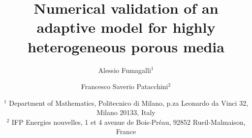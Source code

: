 \documentclass[11pt]{article}
\numberwithin{equation}{section}
\theoremstyle{plain}
\theoremstyle{namedthmstyle}
\begin{document}
\title{Numerical validation of an adaptive model for highly heterogeneous porous media}

\author{Alessio Fumagalli$^1$ \and Francesco Saverio Patacchini$^2$}

\date{
$^1$ Department of Mathematics, Politecnico di Milano, p.za Leonardo da Vinci 32, Milano 20133, Italy\\%
$^2$ IFP Energies nouvelles, 1 et 4 avenue de Bois-Pr\'eau, 92852 Rueil-Malmaison, France
}

\maketitle









\end{document}
